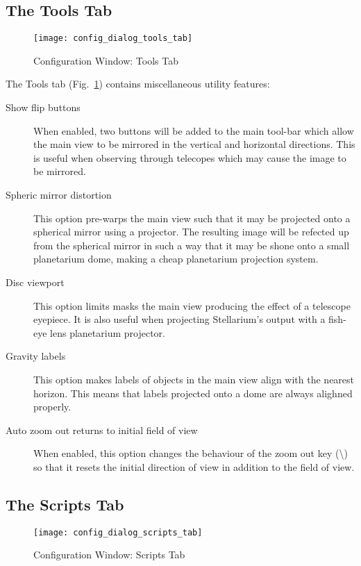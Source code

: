 \subsection{The Tools Tab}
\label{sec:gui:configuration:tools}


\begin{figure}[p]
\centering\texttt{[image: config\_dialog\_tools\_tab]}
\caption{Configuration Window: Tools Tab}
\label{fig:gui:configuration:tools}
\end{figure}


The Tools tab (Fig.~\ref{fig:gui:configuration:tools}) contains miscellaneous utility
features:

\begin{description}
\item[Show flip buttons] When enabled, two buttons will be added to
  the main tool-bar which allow the main view to be mirrored in the
  vertical and horizontal directions. This is useful when observing
  through telecopes which may cause the image to be mirrored.
\item[Spheric mirror distortion] This option pre-warps the main view
  such that it may be projected onto a spherical mirror using a
  projector. The resulting image will be refected up from the spherical
  mirror in such a way that it may be shone onto a small planetarium
  dome, making a cheap planetarium projection system.
\item[Disc viewport] This option limits masks the main view
  producing the effect of a telescope eyepiece. It is also useful when
  projecting Stellarium's output with a fish-eye lens planetarium
  projector.
\item[Gravity labels] This option makes labels of objects in the
  main view align with the nearest horizon. This means that labels
  projected onto a dome are always alighned properly.
\item[Auto zoom out returns to initial field of view] When enabled,
  this option changes the behaviour of the zoom out key
  (\textbackslash{}) so that it resets the initial direction of view in
  addition to the field of view.
\end{description}

\subsection{The Scripts Tab}
\label{sec:gui:scripts}


\begin{figure}[p]
\centering\texttt{[image: config\_dialog\_scripts\_tab]}
\caption{Configuration Window: Scripts Tab}
\label{fig:gui:configuration:scripts}
\end{figure}

